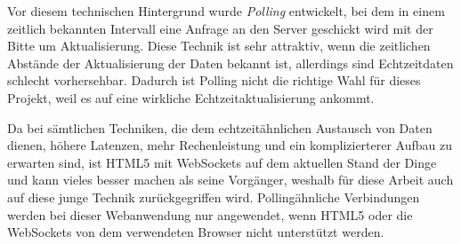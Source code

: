 Vor diesem technischen Hintergrund wurde \emph{Polling} entwickelt, bei dem in einem zeitlich bekannten Intervall eine Anfrage an den Server geschickt wird mit der Bitte um Aktualisierung. Diese Technik ist sehr attraktiv, wenn die zeitlichen Abstände der Aktualisierung der Daten bekannt ist, allerdings sind Echtzeitdaten schlecht vorhersehbar. Dadurch ist Polling nicht die richtige Wahl für dieses Projekt, weil es auf eine wirkliche Echtzeitaktualisierung ankommt.\par

Da bei sämtlichen Techniken, die dem echtzeitähnlichen Austausch von Daten dienen, höhere Latenzen, mehr Rechenleistung und ein komplizierterer Aufbau zu erwarten sind, ist HTML5 mit WebSockets auf dem aktuellen Stand der Dinge und kann vieles besser machen als seine Vorgänger, weshalb für diese Arbeit auch auf diese junge Technik zurückgegriffen wird. Pollingähnliche Verbindungen werden bei dieser Webanwendung nur angewendet, wenn HTML5 oder die WebSockets von dem verwendeten Browser nicht unterstützt werden.